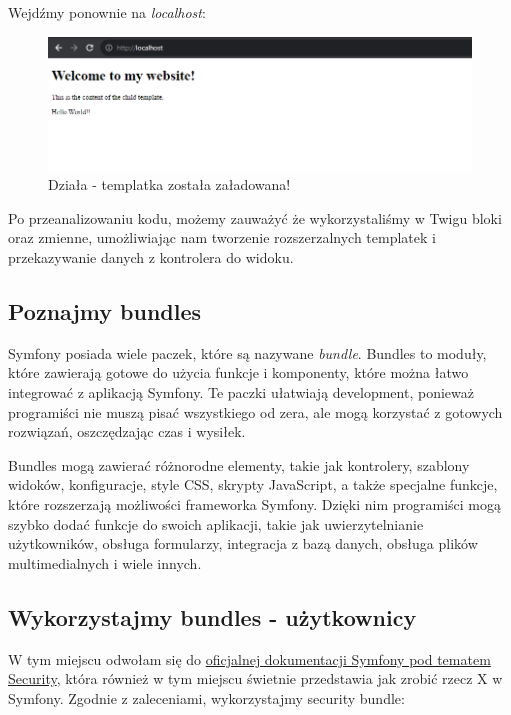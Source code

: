\documentclass[polish, a4paper]{article}
\begin{document}
Wejdźmy ponownie na \emph{localhost}:

\begin{figure}[H]
  \centering
  \includegraphics[width=\textwidth]{localhost hello.png}
  \caption{Działa - templatka została załadowana!}
\end{figure}

Po przeanalizowaniu kodu, możemy zauważyć że wykorzystaliśmy w Twigu bloki oraz zmienne, umożliwiając nam tworzenie rozszerzalnych templatek i przekazywanie danych z kontrolera do widoku.


\subsection{Poznajmy bundles}
Symfony posiada wiele paczek, które są nazywane \emph{bundle}. Bundles to moduły, które zawierają gotowe do użycia funkcje i komponenty, które można łatwo integrować z aplikacją Symfony. Te paczki ułatwiają development, ponieważ programiści nie muszą pisać wszystkiego od zera, ale mogą korzystać z gotowych rozwiązań, oszczędzając czas i wysiłek.

Bundles mogą zawierać różnorodne elementy, takie jak kontrolery, szablony widoków, konfiguracje, style CSS, skrypty JavaScript, a także specjalne funkcje, które rozszerzają możliwości frameworka Symfony. Dzięki nim programiści mogą szybko dodać funkcje do swoich aplikacji, takie jak uwierzytelnianie użytkowników, obsługa formularzy, integracja z bazą danych, obsługa plików multimedialnych i wiele innych.

\subsection{Wykorzystajmy bundles - użytkownicy}

W tym miejscu odwołam się do \href{https://symfony.com/doc/current/security.html}{oficjalnej dokumentacji Symfony pod tematem Security}, która również w tym miejscu świetnie przedstawia jak zrobić rzecz X w Symfony. Zgodnie z zaleceniami, wykorzystajmy security bundle:
\end{document}
